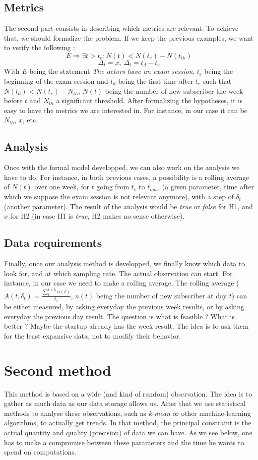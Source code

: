 \documentclass[twoside]{report}
\begin{document}
	\subsection{Metrics}
	The second part consists in describing which metrics are relevant. To achieve that, we should formalize the problem. If we keep the previous examples, we want to verify the following :
	$$E \Rightarrow \exists t > t_e : N(t) < N(t_e) - N(t_{th})$$
	$$\Delta_t = x,\ \Delta_t = t_d - t_e$$
	With $E$ being the statement \emph{The actors have an exam session}, $t_e$ being the beginning of the exam session and $t_d$ being the first time after $t_e$ such that $N(t_d) < N(t_e) - N_{th}$, $N(t)$ being the number of new subscriber the week before $t$ and $N_{th}$ a significant threshold.
	After formalizing the hypotheses, it is easy to have the metrics we are interested in. For instance, in our case it can be $N_{th}$, $x$, etc.
	\subsection{Analysis}
	Once with the formal model developped, we can also work on the analysis we have to do. For instance, in both previous cases, a possibility is a rolling average of $N(t)$ over one week, for $t$ going from $t_e$ to $t_{max}$ (a given parameter, time after which we suppose the exam session is not relevant anymore), with a step of $\delta_t$ (another parameter). The result of the analysis would be \emph{true} or \emph{false} for H1, and $x$ for H2 (in case H1 is \emph{true}, H2 makes no sense otherwise). 
	\subsection{Data requirements}
	Finally, once our analysis method is developped, we finally know which data to look for, and at which sampling rate. The actual observation can start. For instance, in our case we need to make a rolling average. The rolling average ($A(t, \delta_t) = \frac{\sum_t^{t + \delta_t}n(t)}{\delta_t}$, $n(t)$ being the number of new subscriber at day $t$) can be either measured, by asking everyday the previous week results, or by asking everyday the previous day result. The question is what is feasible ? What is better ? Maybe the startup already has the week result. The idea is to ask them for the least expansive data, not to modify their behavior.

	\section{Second method}
	This method is based on a wide (and kind of random) observation. The idea is to gather as much data as our data storage allows us. After that we use statistical methods to analyse these observations, such as \emph{k-mean} or other machine-learning algorithms, to actually get trends. In that method, the principal constraint is the actual quantity and quality (precision) of data we can have. As we see below, one has to make a compromise between these parameters and the time he wants to spend on computations.
\end{document}

